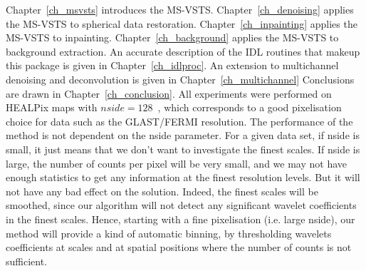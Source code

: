  Chapter~\ref{ch_msvsts} introduces the MS-VSTS. 
 Chapter~\ref{ch_denoising} applies the MS-VSTS to spherical data restoration. Chapter~\ref{ch_inpainting} applies the MS-VSTS to inpainting. Chapter~\ref{ch_background} applies the MS-VSTS to background extraction. An accurate description of the IDL routines that makeup this package is given in Chapter~\ref{ch_idlproc}. An extension to multichannel denoising and deconvolution is given in Chapter~\ref{ch_multichannel} Conclusions are drawn in Chapter~\ref{ch_conclusion}. All experiments were performed on HEALPix maps with $nside=128$~\citep{pixel:healpix}, which corresponds to a good pixelisation choice for  data such as the GLAST/FERMI resolution. The performance of the method is not dependent on the nside parameter. For a given data set, if nside is small, it just means that we don't want to investigate the finest scales. If nside is large, the number of counts per pixel will be very small, and we may not have enough statistics to get any information at the finest resolution levels. But it will not have any bad effect on the solution. Indeed,  the finest scales
will be smoothed, since our algorithm will not detect any significant wavelet coefficients in the finest scales. Hence, starting with a fine pixelisation (i.e. large nside), our method will provide a kind of automatic binning, by thresholding wavelets coefficients at scales and at spatial positions where the number of counts is not sufficient.




